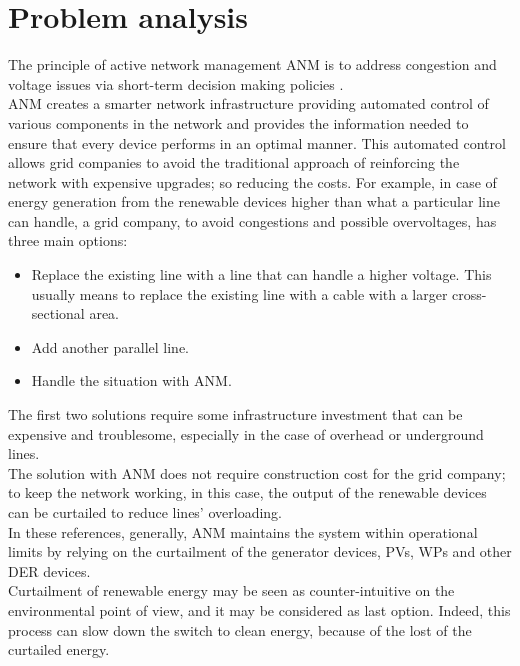 \chapter{Problem analysis}
\label{chapter4}
The principle of active network management \gls{ANM} is to address congestion and voltage issues via short-term decision making policies \cite{ANMQuentin}. \\
\gls{ANM} creates a smarter network infrastructure providing automated control of various components in the network and provides the information needed to ensure that every device performs in an optimal manner. This automated control allows grid companies to avoid the traditional approach of reinforcing the network with expensive upgrades; so reducing the costs.
For example, in case of energy generation from the renewable devices higher than what a particular line can handle, a grid company, to avoid congestions and possible overvoltages, has three main options:
\begin{itemize}
    \item Replace the existing line with a line that can handle a higher voltage. This usually means to replace the existing line with a cable with a larger cross-sectional area.
    \item Add another parallel line.
    \item Handle the situation with \gls{ANM}.
\end{itemize}
The first two solutions require some infrastructure investment that can be expensive and troublesome, especially in the case of overhead or underground lines.\\
The solution with \gls{ANM} does not require construction cost for the grid company; to keep the network working, in this case, the output of the renewable devices can be curtailed to reduce lines' overloading. \\

In these references, generally, \gls{ANM} maintains the system within operational limits by relying on the curtailment of the generator devices, \glspl{PV}, \glspl{WP} and other \gls{DER} devices. \\
Curtailment of renewable energy may be seen as counter-intuitive on the environmental point of view, and it may be considered as last option. Indeed, this process can slow down the switch to clean energy, because of the lost of the curtailed energy. \\

